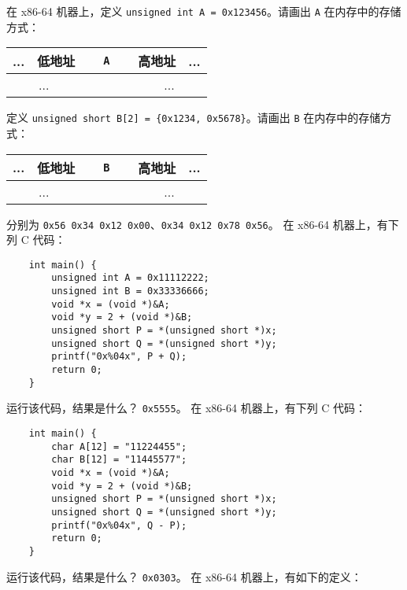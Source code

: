 	\begin{problems}
		\pro 在 x86-64 机器上，定义 \texttt{unsigned int A = 0x123456}。请画出 \texttt{A} 在内存中的存储方式：
		\begin{table}[H]
			\centering
			\begin{tabular}{|c|c|c|c|c|c|c|c|}
				\hline
				... & 低地址 & \multicolumn{4}{c|}{\texttt{A}} & 高地址 & ... \\ \hline
				\multicolumn{2}{|c|}{...} & {\qquad \qquad} & {\qquad \qquad} & {\qquad \qquad} & {\qquad \qquad} & \multicolumn{2}{c|}{...} \\ \hline
			\end{tabular}
		\end{table}
		定义 \texttt{unsigned short B[2] = \{0x1234, 0x5678\}}。请画出 \texttt{B} 在内存中的存储方式：
		\begin{table}[H]
			\centering
			\begin{tabular}{|c|c|c|c|c|c|c|c|}
				\hline
				... & 低地址 & \multicolumn{4}{c|}{\texttt{B}} & 高地址 & ... \\ \hline
				\multicolumn{2}{|c|}{...} & {\qquad \qquad} & {\qquad \qquad} & {\qquad \qquad} & {\qquad \qquad} & \multicolumn{2}{c|}{...} \\ \hline
			\end{tabular}
		\end{table}
		\sol 分别为 \verb|0x56 0x34 0x12 0x00|、\verb|0x34 0x12 0x78 0x56|。
		\pro 在 x86-64 机器上，有下列 C 代码：
		\begin{verbatim}
    int main() {
        unsigned int A = 0x11112222;
        unsigned int B = 0x33336666;
        void *x = (void *)&A;
        void *y = 2 + (void *)&B;
        unsigned short P = *(unsigned short *)x;
        unsigned short Q = *(unsigned short *)y;
        printf("0x%04x", P + Q);
        return 0;
    }
		\end{verbatim}
		运行该代码，结果是什么？
		\sol \verb|0x5555|。
		\pro 在 x86-64 机器上，有下列 C 代码：
		\begin{verbatim}
    int main() {
        char A[12] = "11224455";
        char B[12] = "11445577";
        void *x = (void *)&A;
        void *y = 2 + (void *)&B;
        unsigned short P = *(unsigned short *)x;
        unsigned short Q = *(unsigned short *)y;
        printf("0x%04x", Q - P);
        return 0;
    }
		\end{verbatim}
		运行该代码，结果是什么？
		\sol \verb|0x0303|。
		\pro 在 x86-64 机器上，有如下的定义：
		\begin{verbatim}

\end{verbatim}
\end{problems}

